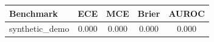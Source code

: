 \begin{tabular}{lcccc}
\toprule
Benchmark & ECE & MCE & Brier & AUROC \\
\midrule
synthetic_demo & 0.000 & 0.000 & 0.000 & 0.000 \\
\bottomrule
\end{tabular}
